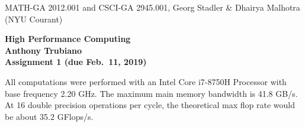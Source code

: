 \documentclass[11pt]{article}
\begin{document}
\begin{center}
  \vspace*{-2cm}
{\small MATH-GA 2012.001 and CSCI-GA 2945.001, Georg Stadler \&
  Dhairya Malhotra (NYU Courant)}
\end{center}
\vspace*{.5cm}
\begin{center}
\large \textbf{%
High Performance Computing \\
Anthony Trubiano \\
Assignment 1 (due Feb.\ 11, 2019) }
\end{center}


 All computations were performed with an Intel Core i7-8750H Processor with base frequency 2.20 GHz. The maximum main memory bandwidth is 41.8 GB/s. At 16 double 
precision operations per cycle, the theoretical max flop rate would be about 35.2 GFlops/s. 
\end{document}
